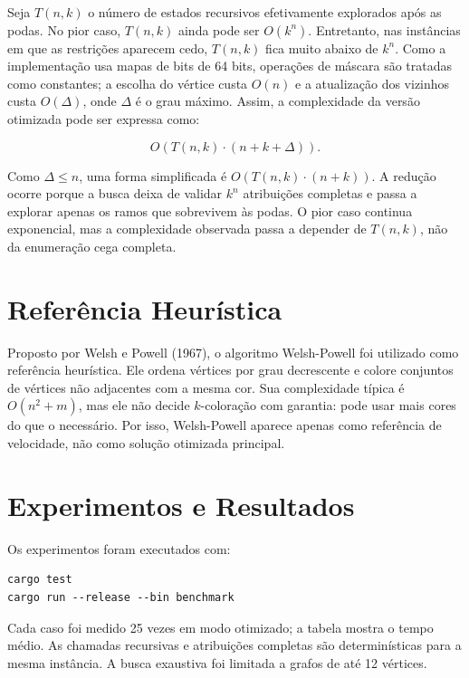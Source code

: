 \documentclass[12pt]{article}
\begin{document}
Seja $T(n,k)$ o número de estados recursivos efetivamente explorados após as
podas. No pior caso, $T(n,k)$ ainda pode ser $O(k^n)$. Entretanto, nas
instâncias em que as restrições aparecem cedo, $T(n,k)$ fica muito abaixo de
$k^n$. Como a implementação usa mapas de bits de 64 bits, operações de máscara
são tratadas como constantes; a escolha do vértice custa $O(n)$ e a atualização dos
vizinhos custa $O(\Delta)$, onde $\Delta$ é o grau máximo. Assim, a complexidade
da versão otimizada pode ser expressa como:

\[
O(T(n,k) \cdot (n + k + \Delta)).
\]

Como $\Delta \leq n$, uma forma simplificada é
$O(T(n,k) \cdot (n+k))$. A redução ocorre porque a busca deixa de validar
$k^n$ atribuições completas e passa a explorar apenas os ramos que sobrevivem às
podas. O pior caso continua exponencial, mas a complexidade observada passa a
depender de $T(n,k)$, não da enumeração cega completa.

\section{Referência Heurística}

Proposto por Welsh e Powell (1967), o algoritmo Welsh-Powell foi utilizado como
referência heurística. Ele ordena vértices por grau decrescente e colore
conjuntos de vértices não adjacentes com a mesma cor. Sua complexidade típica é
$O(n^2 + m)$, mas ele não decide $k$-coloração com garantia: pode usar mais
cores do que o necessário. Por isso, Welsh-Powell aparece apenas como referência
de velocidade, não como solução otimizada principal.

\section{Experimentos e Resultados}

Os experimentos foram executados com:

\begin{verbatim}
cargo test
cargo run --release --bin benchmark
\end{verbatim}

Cada caso foi medido 25 vezes em modo otimizado; a tabela mostra o tempo
médio. As chamadas recursivas e atribuições completas são determinísticas para a
mesma instância. A busca exaustiva foi limitada a grafos de até 12 vértices.
\end{document}
